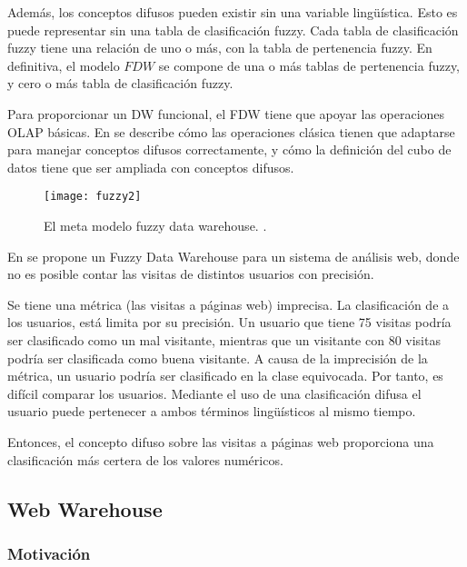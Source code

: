 \documentclass[a4paper,11pt]{article}
\begin{document}
    Además, los conceptos difusos pueden existir sin una variable lingüística. Esto es puede representar sin una tabla de clasificación fuzzy.
    Cada tabla de clasificación fuzzy tiene una relación de uno o más, con la tabla de  pertenencia fuzzy. En definitiva, el modelo $FDW$ se compone de una o más tablas
    de  pertenencia fuzzy, y cero o más tabla de clasificación fuzzy.
    
    Para proporcionar un DW funcional, el FDW tiene que apoyar las operaciones OLAP básicas. En \cite{Fasel14} se describe cómo las operaciones clásica tienen que
    adaptarse para manejar conceptos difusos correctamente, y cómo la definición del cubo de datos tiene que ser ampliada con conceptos difusos.
    
    \begin{figure}
      \begin{center}
        \texttt{[image: fuzzy2]}
        \caption{El meta modelo fuzzy data warehouse. \cite[p.~63]{Fasel14}.}
        \label{modeloFuzzy}
      \end{center}
    \end{figure}
    
    En \cite{Fasel09} se propone un Fuzzy Data Warehouse para un sistema de análisis web, donde no es posible contar las visitas de distintos usuarios con precisión.

    Se tiene una métrica (las visitas a páginas web) imprecisa. La clasificación de a los usuarios, está limita por su precisión.
    Un usuario que tiene 75 visitas podría ser clasificado como un mal visitante, mientras que un visitante con 80 visitas podría ser clasificada como buena visitante.
    A causa de la imprecisión de la métrica, un usuario podría ser clasificado en la clase equivocada. Por tanto, es difícil comparar los usuarios.
    Mediante el uso de una clasificación difusa el usuario puede pertenecer a ambos términos lingüísticos al mismo tiempo.
        
    Entonces, el concepto difuso sobre las visitas a páginas web proporciona una clasificación más certera de los valores numéricos.
    
    
    \subsection{Web Warehouse}
    
    \subsubsection{Motivación}
    
\end{document}
